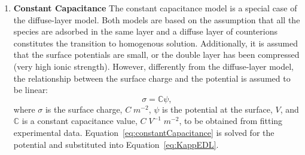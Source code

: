 \begin{enumerate}
\begin{enumerate}
\item \textbf{Constant Capacitance} The constant capacitance model is
  a special case of the diffuse-layer model. Both models are based on
  the assumption that all the species are adsorbed in the same layer
  and a diffuse layer of counterions constitutes the transition to
  homogenous solution.  Additionally, it is assumed that the surface
  potentials are small, or the double layer has been compressed (very
  high ionic strength).  However, differently from the diffuse-layer
  model, the relationship between the surface charge and the potential
  is assumed to be linear:
%
\begin{equation} \label{eq:constantCapacitance} 
  \sigma  = \mathbb{C}\psi  ,
\end{equation} 
where $\sigma$ is the surface charge, $C\;m^{-2}$, $\psi$ is the
potential at the surface, $V$, and $\mathbb{C}$ is a constant
capacitance value, $C\;V^{-1}\;m^{-2}$, to be obtained from fitting
experimental data.  Equation~\eqref{eq:constantCapacitance} is solved
for the potential and substituted into Equation~\eqref{eq:KappEDL}.


\end{enumerate}
\end{enumerate}
